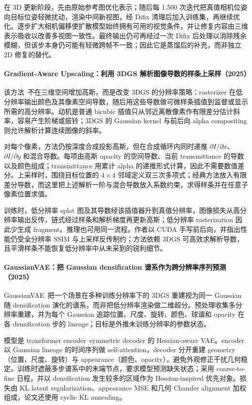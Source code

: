 在 3D 更新阶段，先由原始参考图优化表示；随后每 1,500 次迭代把真值相机位姿向目标位姿轻微扰动，渲染中间新视图，经 Difix 清理后加入训练集，再继续优化。逐步扩大相机偏移使扩散模型始终拥有可用的视觉条件，并让修复内容由三维表示吸收以改善多视图一致性。最终输出仍可再经过一次 Difix 后处理以消除残余模糊，但该步本身仍可能有轻微跨帧不一致；因此它是蒸馏后的补充，而非独立 2D 修复的替代。

\paragraph{Gradient-Aware Upscaling：利用 3DGS 解析图像导数的样条上采样（2025）\cite{2503_14171}}
该方法~\cite{2503_14171}不在三维空间增加高斯，而是改变 3DGS 的分辨率策略：rasterizer 在低分辨率输出颜色及其像素空间导数，随后用这些导数做可微样条插值到监督或显示所需的高分辨率。动机是普通 bicubic 插值只从邻近离散像素作有限差分估计斜率，容易产生阶梯或振铃；3DGS 的 Gaussian kernel 与前后向 alpha compositing 则允许解析计算连续图像的斜率。

对每个像素，方法仍按深度合成投影高斯，但在合成循环内同时递推 $\partial I/\partial x$、$\partial I/\partial y$ 和混合导数。每项由高斯 opacity 的空间导数、当前 transmittance 的导数以及颜色组成；transmittance 用累计 alpha 的递推形式计算，因此不需要数值差分。上采样时，围绕目标位置的 $4\times4$ 邻域定义双三次多项式；经典方法放入有限差分导数，而这里把上述解析一阶与混合导数放入系数约束，求得样条并在任意子像素位置求值。

训练时，低分辨率 splat 图及其导数经该插值器升到真值分辨率，图像损失从高分辨率输出反传，链式经过样条和解析梯度再更新高斯；低分辨率 rasterization 因此少生成 fragment。推理也可用同一流程。作者以 CUDA 手写前后向，并指出性能仍受全分辨率 SSIM 与上采样反传制约；方法依赖 3DGS 可高效求解析导数，且平滑样条不能恢复低分辨率中从未采到的锐利细节。

\paragraph{GaussianVAE：把 Gaussian densification 谱系作为跨分辨率序列预测（2025）\cite{2506_07897}}
GaussianVAE~\cite{2506_07897}把一个场景在多种训练分辨率下的 3DGS 重建视为同一 Gaussian 随 densification 演化的谱系，而非把低分辨率渲染做二维超分。预处理收集多分辨率重建，并为每个 Gaussian 追踪位置、尺度、旋转、颜色、球谐和 opacity 在各 densification 步的 lineage；目标是外推未训练分辨率的参数状态。

模型是 transformer encoder--symmetric decoder 的 Hessian-aware VAE。encoder 以 Gaussian lineage 的时间序列做 self-attention，decoder 分开重建 geometry（位置、尺度、旋转）与 appearance（颜色、opacity），避免外观修正干扰几何稳定。训练时遮蔽多步谱系中的末端节点，要求模型预测缺失状态；采用 coarse-to-fine 日程，并以 densification 发生较多的区域作为 Hessian-inspired 优先对象。损失由 KL latent regularization、appearance MSE 和几何 Chamfer alignment 加权组成，论文还使用 cyclic KL annealing。

